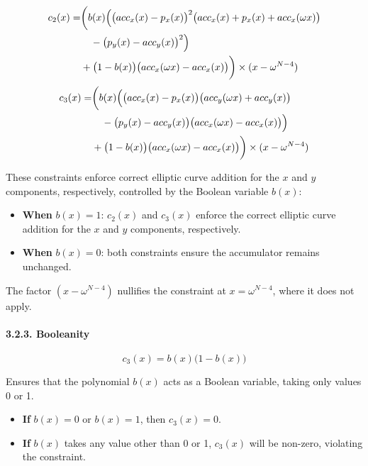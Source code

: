 \documentclass[
]{article}
\providecommand{\tightlist}{%
  \setlength{\itemsep}{0pt}\setlength{\parskip}{0pt}}
\begin{document}
\[\begin{aligned}
c_2(x) = & \biggl( b(x) \Bigl( \bigl(acc_x(x) - p_x(x)\bigr)^2 \bigl(acc_x(x) + p_x(x) + acc_x(\omega x)\bigr) \\
         & \quad - \bigl(p_y(x) - acc_y(x)\bigr)^2 \Bigr) \\
         & + \bigl(1 - b(x)\bigr) \bigl(acc_x(\omega x) - acc_x(x)\bigr) \biggr) \times (x - \omega^{N-4}) \\
\end{aligned}\] \[\begin{aligned}
c_3(x) = & \biggl( b(x) \Bigl( \bigl(acc_x(x) - p_x(x)\bigr)\bigl(acc_y(\omega x) + acc_y(x)\bigr) \\
         & \quad - \bigl(p_y(x) - acc_y(x)\bigr)\bigl(acc_x(\omega x) - acc_x(x)\bigr) \Bigr) \\
         & + \bigl(1 - b(x)\bigr) \bigl(acc_x(\omega x) - acc_x(x)\bigr) \biggr) \times (x - \omega^{N-4})
\end{aligned}\]

These constraints enforce correct elliptic curve addition for the \(x\)
and \(y\) components, respectively, controlled by the Boolean variable
\(b(x)\):

\begin{itemize}
\tightlist
\item
  \textbf{When} \(b(x) = 1\): \(c_2(x)\) and \(c_3(x)\) enforce the
  correct elliptic curve addition for the \(x\) and \(y\) components,
  respectively.
\item
  \textbf{When} \(b(x) = 0\): both constraints ensure the accumulator
  remains unchanged.
\end{itemize}

The factor \((x - \omega^{N-4})\) nullifies the constraint at
\(x = \omega^{N-4}\), where it does not apply.

\hypertarget{booleanity}{%
\paragraph{3.2.3. Booleanity}\label{booleanity}}

\[c_3(x) = b(x)\bigl(1 - b(x)\bigr)\]

Ensures that the polynomial \(b(x)\) acts as a Boolean variable, taking
only values 0 or 1.

\begin{itemize}
\tightlist
\item
  \textbf{If} \(b(x) = 0\) or \(b(x) = 1\), then \(c_3(x) = 0\).
\item
  \textbf{If} \(b(x)\) takes any value other than 0 or 1, \(c_3(x)\)
  will be non-zero, violating the constraint.
\end{itemize}
\end{document}
